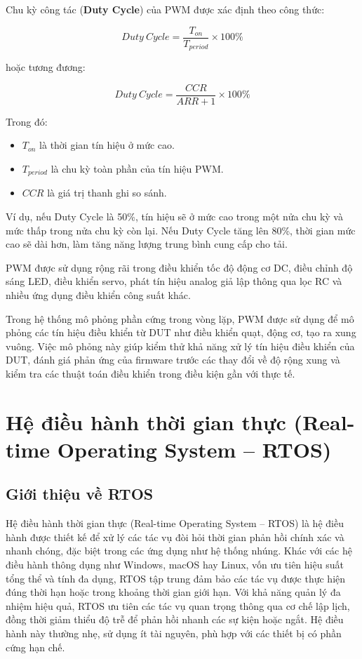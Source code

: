 Chu kỳ công tác (\textbf{Duty Cycle}) của PWM được xác định theo công thức:

\begin{equation}
Duty\ Cycle = \frac{T_{on}}{T_{period}} \times 100\%
\end{equation}

hoặc tương đương:

\begin{equation}
Duty\ Cycle = \frac{CCR}{ARR + 1} \times 100\%
\end{equation}

Trong đó:
\begin{itemize}
    \item $T_{on}$ là thời gian tín hiệu ở mức cao.
    \item $T_{period}$ là chu kỳ toàn phần của tín hiệu PWM.
    \item $CCR$ là giá trị thanh ghi so sánh.
\end{itemize}

Ví dụ, nếu Duty Cycle là 50\%, tín hiệu sẽ ở mức cao trong một nửa chu kỳ và mức thấp trong nửa chu kỳ còn lại. Nếu Duty Cycle tăng lên 80\%, thời gian mức cao sẽ dài hơn, làm tăng năng lượng trung bình cung cấp cho tải.

PWM được sử dụng rộng rãi trong điều khiển tốc độ động cơ DC, điều chỉnh độ sáng LED, điều khiển servo, phát tín hiệu analog giả lập thông qua lọc RC và nhiều ứng dụng điều khiển công suất khác.

Trong hệ thống mô phỏng phần cứng trong vòng lặp, PWM được sử dụng để mô phỏng các tín hiệu điều khiển từ DUT như điều khiển quạt, động cơ, tạo ra xung vuông. Việc mô phỏng này giúp kiểm thử khả năng xử lý tín hiệu điều khiển của DUT, đánh giá phản ứng của firmware trước các thay đổi về độ rộng xung và kiểm tra các thuật toán điều khiển trong điều kiện gần với thực tế.

\section{Hệ điều hành thời gian thực (Real-time Operating System – RTOS)}
\subsection{Giới thiệu về RTOS}
Hệ điều hành thời gian thực (Real-time Operating System – RTOS) là hệ điều hành được thiết kế để xử lý các tác vụ đòi hỏi thời gian phản hồi chính xác và nhanh chóng, đặc biệt trong các ứng dụng như hệ thống nhúng. 
Khác với các hệ điều hành thông dụng như Windows, macOS hay Linux, vốn ưu tiên hiệu suất tổng thể và tính đa dụng, RTOS tập trung đảm bảo các tác vụ được thực hiện đúng thời hạn hoặc trong khoảng thời gian giới hạn. 
Với khả năng quản lý đa nhiệm hiệu quả, RTOS ưu tiên các tác vụ quan trọng thông qua cơ chế lập lịch, đồng thời giảm thiểu độ trễ để phản hồi nhanh các sự kiện hoặc ngắt. Hệ điều hành này thường nhẹ, sử dụng ít tài nguyên, phù hợp với các thiết bị có phần cứng hạn chế.

